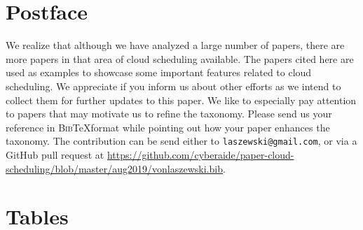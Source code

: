 \documentclass[final,5p,times,twocolumn]{elsarticle}
\begin{document}
\section*{Postface}

We realize that although we have analyzed a large number of papers,
there are more papers in that area of cloud scheduling available. The
papers cited here are used as examples to showcase some important
features related to cloud scheduling.  We appreciate if you inform us
about other efforts as we intend to collect them for further updates
to this paper. We like to especially pay attention to papers that may
motivate us to refine the taxonomy. Please send us your reference in
\textsc{Bib}\TeX format while pointing out how your paper enhances the
taxonomy. The contribution can be send either to
\verb|laszewski@gmail.com|, or via a GitHub pull request at
\url{https://github.com/cyberaide/paper-cloud-scheduling/blob/master/aug2019/vonlaszewski.bib}.


%




\appendix

\section{Tables}

















\afterpage{\clearpage}


\end{document}
